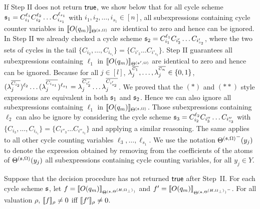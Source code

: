 If Step II does not return $\mathsf{true}$, we show below that for all cycle scheme ${\mathfrak{s} }_1=C_{i_1}^{\ell_1} C_{i_2}^{\ell_2} \dots C_{i_{s_1}}^{\ell_{s_1}}$ with $i_1,i_2,\dots,i_{s_1} \in [n]$, all subexpressions containing cycle counter variables in $\llbracket O(q_m)\rrbracket_{\Theta^{({\mathfrak{s} },\Omega)}}$ are identical to zero and hence can be ignored.
In Step II we already checked a cycle scheme ${\mathfrak{s} }_2=C_{i_1}^{\ell_1} C_{i'_2} \dots C_{i'_{s_2}}$, where the two sets of cycles in the tail 
$\{C_{i_2} ,\dots, C_{i_{s_1}}\}=\{C_{i'_2} \dots C_{i'_{s_2}}\}$. Step II guarantees all subexpressions containing $\ell_1$ in 
$\llbracket O(q_m)\rrbracket_{\Theta^{({\mathfrak{s} }',\Omega)}}$ are identical to zero and hence can be ignored.
Because for all $j\in[l]$, $\lambda^{^{\overline{C_1}}}_j, \dots, \lambda^{^{\overline{C_n}}}_j \in \{0,1\}$,   $(\lambda^{\overline{C_{i_2}}}_{j})^{\ell_2} \dots (\lambda^{\overline{C_{i_{s_1}}}}_{j})^{\ell_{s_1}} = \lambda^{\overline{C_{i'_2}}}_{j} \dots \lambda^{\overline{C_{i'_{s_2}}}}_{j}$. We proved that the $(\ast)$ and $(\ast\ast)$ style expressions are equivalent in both ${\mathfrak{s} }_1$ and ${\mathfrak{s} }_2$.
Hence we can also ignore all subexpressions containing $\ell_1$ in  $\llbracket O(q_m)\rrbracket_{\Theta^{({\mathfrak{s} },\Omega)}}$.
Those subexpressions containing $\ell_2$ can also be ignore by considering the cycle scheme ${\mathfrak{s} }_3=C_{i_2}^{\ell_2} C_{i''_3} \dots C_{i''_{s_3}}$ with $\{C_{i_3} ,\dots, C_{i_{s_1}}\}=\{C_{i''_3} \dots C_{i''_{s_3}}\}$ and applying a similar reasoning. The same applies to all other cycle counting variables $\ell_3,\dots,\ell_{s_1}$.
We use the notation ${\Theta^{({\mathfrak{s} },\Omega)}}^-(y_j)$ to denote the expression obtained by removing from the coefficients of the atoms of $\Theta^{({\mathfrak{s} },\Omega)}(y_j)$ all subexpressions containing cycle counting variables, for all $y_j \in Y$. 

\begin{lemma}\label{prop-bnd-domain-1}
	Suppose that the decision procedure has not returned $\mathsf{true}$ after Step~II. For each cycle scheme ${\mathfrak{s} }$, let $f=\llbracket O(q_m)\rrbracket_{\Theta^{({\mathfrak{s} }, \Theta^{(H,\Omega_\bot)})}}$ and $f'=\llbracket O(q_m)\rrbracket_{{\Theta^{({\mathfrak{s} }, \Theta^{(H,\Omega_\bot)})}}^-}$. For all valuation $\rho$, $\llbracket f\rrbracket_{\rho}\neq 0$ iff $\llbracket f'\rrbracket_{\rho} \neq 0$.
\end{lemma}





